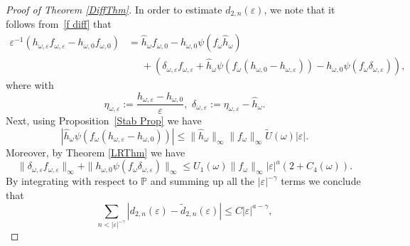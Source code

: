 \documentclass[11pt,reqno,a4paper]{article}
\theoremstyle{special}
\def\om{\omega}
\begin{document}
\begin{proof}[Proof of Theorem \ref{DiffThm}]

In order to estimate $d_{2,n}(\varepsilon)$,  we  note that it follows from~\eqref{f diff} that 
\[
\begin{split}
\varepsilon^{-1}(h_{\om, \varepsilon}f_{\om, \varepsilon}-h_{\om, 0}f_{\om, 0}) &=\hat h_\om f_{\om, 0}-h_{\om, 0}\psi(f_\om \hat h_\om)\\
&\phantom{=}+\left(\delta_{\om, \varepsilon}f_{\om, \varepsilon}+\hat h_\om \psi(f_\om(h_{\om, 0}-h_{\om, \varepsilon})) -h_{\om, 0}\psi(f_\om\delta_{\om, \varepsilon})\right),
\end{split}
\]
where with
\begin{equation}\label{eta delta def}
\eta_{\om, \varepsilon}:=\frac{h_{\om, \varepsilon}-h_{\om, 0}}{\varepsilon}, \,\,\delta_{\om,\varepsilon}:=\eta_{\om, \varepsilon}-\hat h_\om.    
\end{equation}
Next, using Proposition~\ref{Stab Prop} we have
$$
|\hat h_\om \psi(f_\om(h_{\om, \varepsilon}-h_{\om, 0}))|\leq \|\hat h_\om\|_\infty\|f_\om\|_\infty \tilde U(\om)|\varepsilon|. 
$$
Moreover, by Theorem \ref{LRThm} we have 
$$
\|\delta_{\om, \varepsilon}f_{\om, \varepsilon}\|_\infty+\|h_{\om,0}\psi(f_\om \delta_{\om, \varepsilon})\|_\infty\leq U_1(\om)\|f_\om\|_\infty|\varepsilon|^a(2+C_4(\om)).
$$
By integrating with respect to  $\mathbb P$ and summing up all the $|\varepsilon|^{-\gamma}$ terms we conclude that
$$
\sum_{n<|\varepsilon|^{-\gamma}}|d_{2,n}(\varepsilon)-\tilde d_{2,n}(\varepsilon)|\leq C|\varepsilon|^{a-\gamma},
$$
\end{proof}
\end{document}
